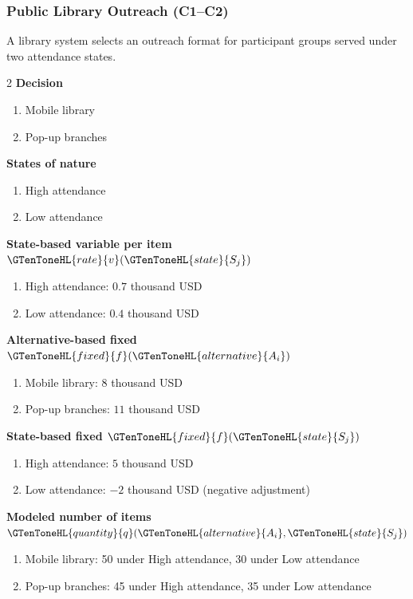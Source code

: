 
	\subsubsection{Public Library Outreach (C1--C2)}
	\label{sec:problem32-public-library-outreach-c1-c2}
	A library system selects an outreach format for participant groups served under two attendance states.
	\begin{multicols}{2}
	\textbf{Decision }
	\begin{enumerate}[label=\arabic*.]
\item Mobile library
\item Pop-up branches
	\end{enumerate}
	\textbf{States of nature}
	\begin{enumerate}[label=\arabic*.]
\item High attendance
\item Low attendance
	\end{enumerate}
	\columnbreak
	\textbf{State-based variable  per item $\GTenToneHL{rate}{v}(\GTenToneHL{state}{S_j})$}
\begin{enumerate}[label=\arabic*.]
\item High attendance: $0.7$ thousand USD
\item Low attendance: $0.4$ thousand USD\end{enumerate}
\textbf{Alternative-based fixed  $\GTenToneHL{fixed}{f}(\GTenToneHL{alternative}{A_i})$}
\begin{enumerate}[label=\arabic*.]
\item Mobile library: $8$ thousand USD
\item Pop-up branches: $11$ thousand USD\end{enumerate}
\textbf{State-based fixed  $\GTenToneHL{fixed}{f}(\GTenToneHL{state}{S_j})$}
\begin{enumerate}[label=\arabic*.]
\item High attendance: $5$ thousand USD
\item Low attendance: $-2$ thousand USD (negative adjustment)\end{enumerate}
\textbf{Modeled number of items $\GTenToneHL{quantity}{q}(\GTenToneHL{alternative}{A_i},\GTenToneHL{state}{S_j})$}
\begin{enumerate}[label=\arabic*.]
\item Mobile library: 50 under High attendance, 30 under Low attendance
\item Pop-up branches: 45 under High attendance, 35 under Low attendance
\end{enumerate}
	\end{multicols}

